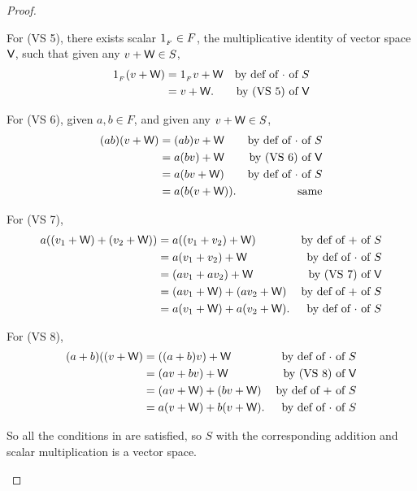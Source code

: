 \begin{proof}
\begin{enumerate}
For (VS 5), there exists scalar \(1_{_F} \in F\), the multiplicative identity of vector space \(\textsf{V}\), such that given any \(v + \textsf{W} \in S\),
\begin{align*}
    1_{_F}(v + \textsf{W})& = 1_{_F} v + \textsf{W} & \text{by def of \(\cdot\) of \(S\)} \\
                          & = v + \textsf{W}. & \text{by (VS 5) of \(\textsf{V}\)}
\end{align*}

For (VS 6), given \(a, b \in F\), and given any \(v + \textsf{W} \in S\),
\begin{align*}
    (ab)(v + \textsf{W}) & = (ab)v + \textsf{W} & \text{by def of \(\cdot\) of \(S\)} \\
                & = a(bv) + \textsf{W} & \text{by (VS 6) of \(\textsf{V}\)} \\
                & = a(bv + \textsf{W}) & \text{by def of \(\cdot\) of \(S\)} \\
                & = a(b(v + \textsf{W})). & \text{same}
\end{align*}

For (VS 7),
\begin{align*}
    a((v_1 + \textsf{W}) + (v_2 + \textsf{W})) & = a((v_1 + v_2) + \textsf{W}) & \text{by def of \(+\) of \(S\)} \\
                             & = a(v_1 + v_2) + \textsf{W} & \text{by def of \(\cdot\) of \(S\)} \\
                             & = (av_1 + av_2) + \textsf{W} & \text{by (VS 7) of \(\textsf{V}\)} \\
                             & = (av_1 + \textsf{W}) + (av_2 + \textsf{W}) & \text{by def of \(+\) of \(S\)} \\
                             & = a(v_1 + \textsf{W}) + a(v_2 + \textsf{W}). & \text{by def of \(\cdot\) of \(S\)}
\end{align*}

For (VS 8),
\begin{align*}
    (a + b)((v + \textsf{W}) & = ((a + b)v) + \textsf{W} & \text{by def of \(\cdot\) of \(S\)} \\
                             & = (av + bv) + \textsf{W} & \text{by (VS 8) of \(\textsf{V}\)} \\
                             & = (av + \textsf{W}) + (bv + \textsf{W}) & \text{by def of \(+\) of \(S\)} \\
                             & = a(v + \textsf{W}) + b(v + \textsf{W}). & \text{by def of \(\cdot\) of \(S\)}
\end{align*}

So all the conditions in  are satisfied, so \(S\) with the corresponding addition and scalar multiplication is a vector space.
\end{enumerate}
\end{proof}

